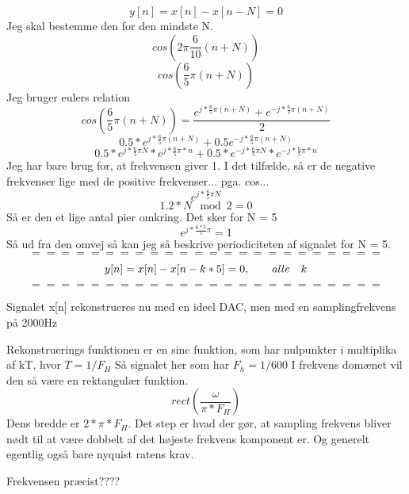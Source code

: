 \begin{EksamensOpgaver}
\begin{Eksamenssæt}[2022]
\begin{eksamensOpgave}
\begin{UnderOpgave}
                \[y[n] = x[n] - x[n - N] = 0\]
                Jeg skal bestemme den for den mindste N. 
                \[cos(2\pi \frac{6}{10} (n + N))\]
                \[cos(\frac{6}{5}\pi (n + N))\] 
                Jeg bruger eulers relation
                \[cos(\frac{6}{5}\pi (n + N)) = \frac{e^{j * \frac{6}{5}\pi (n + N)} + e^{- j * \frac{6}{5}\pi (n + N)}}{2}\]
                \[0.5 * e^{j * \frac{6}{5}\pi (n + N)} + 0.5 e^{- j * \frac{6}{5}\pi (n + N)}\]
                \[0.5 * e^{j * \frac{6}{5}\pi N } * e^{j * \frac{6}{5}\pi * n} + 0.5 * e^{-j * \frac{6}{5}\pi N } * e^{-j * \frac{6}{5}\pi * n}\]
                Jeg har bare brug for, at frekvensen giver 1. I det tilfælde, så er de negative frekvenser lige med de positive frekvenser... pga. cos... 
                \[e^{j * \frac{6}{5}\pi N }\] 
                \[1.2 * N \mod 2 = 0\]
                Så er den et lige antal pier omkring.
                Det sker for N = 5
                \[e^{j * \frac{6 * 5}{5}\pi} = 1\]
                Så ud fra den omvej så kan jeg så beskrive periodiciteten af signalet for N = 5. 
                \[========================\]
                \[y[n] = x[n] - x[n - k * 5] = 0, \tab{1} alle \tab{0} k \]
                \[========================\]
            \end{UnderOpgave}
            Signalet x[n] rekonstrueres nu med en ideel DAC, men med en samplingfrekvens på 2000Hz
            \begin{UnderOpgave}
                Rekonstruerings funktionen er en sinc funktion, som har nulpunkter i multiplika af kT, hvor $T = 1/F_H$
                Så signalet her som har $F_h = 1/600$
                I frekvens domænet vil den så være en rektangulær funktion. 
                \[rect(\frac{\omega}{\pi * F_H})\]
                Dens bredde er $2 * \pi * F_H$. Det step er hvad der gør, at sampling frekvens bliver nødt til at være dobbelt af det højeste frekvens komponent er. 
                Og generelt egentlig også bare nyquist ratens krav.

                Frekvensen præcist???? 
                

\end{UnderOpgave}
\end{eksamensOpgave}
\end{Eksamenssæt}
\end{EksamensOpgaver}
